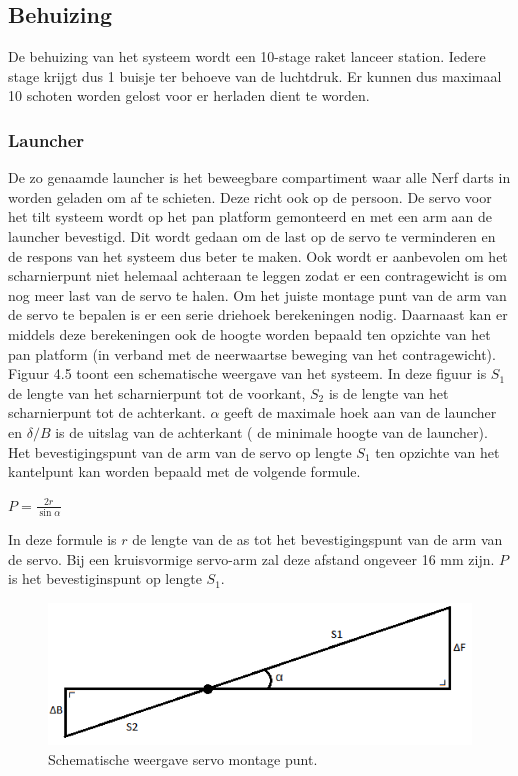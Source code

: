 \begin{cppcode}
\begin{cppcode}
\subsection{Behuizing}
\label{sub:behuizing}
De behuizing van het systeem wordt een 10-stage raket lanceer station. Iedere stage krijgt dus 1
buisje ter behoeve van de luchtdruk. Er kunnen dus maximaal 10 schoten worden gelost voor er
herladen dient te worden.

\subsubsection{Launcher}
\label{subsub:launcher}
De zo genaamde launcher is het beweegbare compartiment waar alle Nerf darts in worden geladen
om af te schieten. Deze richt ook op de persoon.
De servo voor het tilt systeem wordt op het pan platform gemonteerd en met een arm aan de
launcher bevestigd. Dit wordt gedaan om de last op de servo te verminderen en de respons van
het systeem dus beter te maken. Ook wordt er aanbevolen om het scharnierpunt niet helemaal
achteraan te leggen zodat er een contragewicht is om nog meer last van de servo te halen.
Om het juiste montage punt van de arm van de servo te bepalen is er een serie driehoek berekeningen
nodig. Daarnaast kan er middels deze berekeningen ook de hoogte worden bepaald ten
opzichte van het pan platform (in verband met de neerwaartse beweging van het contragewicht).
Figuur 4.5 toont een schematische weergave van het systeem. In deze figuur is $S_1$ de lengte van
het scharnierpunt tot de voorkant, $S_2$ is de lengte van het scharnierpunt tot de achterkant. $\alpha$ geeft
de maximale hoek aan van de launcher en $\delta/B$ is de uitslag van de achterkant ( de minimale hoogte
van de launcher).
Het bevestigingspunt van de arm van de servo op lengte $S_1$ ten opzichte van het kantelpunt kan
worden bepaald met de volgende formule.

$P = \frac{2r}{\sin\alpha}$

In deze formule is $r$ de lengte van de as tot het bevestigingspunt van de arm van de servo. Bij een
kruisvormige servo-arm zal deze afstand ongeveer 16 mm zijn. $P$ is het bevestiginspunt op lengte
$S_1$.

\begin{figure}
    \begin{center}
        \includegraphics[scale=0.5]{figures/kantelpunt_launcher.png}
    \end{center}
    \caption{Schematische weergave servo montage punt.}
    \label{fig:berrLauncher}
\end{figure}


\end{cppcode}
\end{cppcode}
